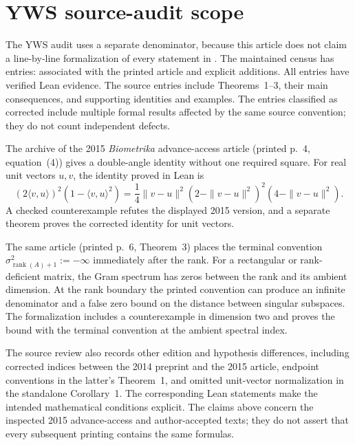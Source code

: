 \section{YWS source-audit scope}
\label{app:yws-coverage}

The YWS audit uses a separate denominator, because this article does not
claim a line-by-line formalization of every statement in
\citet{yu2015davis}. The maintained census has \YWSCensusEntryCount{} entries:
\YWSCensusPaperSourceCount{} associated with the printed article and
\YWSCensusExplicitAdditionCount{} explicit additions. All
\YWSCensusVerifiedCount{} entries have verified Lean evidence. The
source entries include Theorems~1--3, their main consequences, and
supporting identities and examples. The
\YWSCensusCorrectedCount{} entries classified as corrected include multiple
formal results affected by the same source convention; they do not count
independent defects.

The archive of the 2015 \emph{Biometrika} advance-access article (printed
p.~4, equation~(4)) gives a double-angle identity without one required
square. For real unit vectors $u,v$, the identity proved in Lean is
\begin{equation}
  (2\langle v,u\rangle)^2(1-\langle v,u\rangle^2)
  =\frac14\|v-u\|^2(2-\|v-u\|^2)^2(4-\|v-u\|^2).
  \label{eq:yws-equation4-corrected}
\end{equation}
A checked counterexample refutes the displayed 2015 version, and a
separate theorem proves the corrected identity for unit vectors.

The same article (printed p.~6, Theorem~3) places the terminal convention
$\sigma^2_{\operatorname{rank}(A)+1}:=-\infty$ immediately after the rank.
For a rectangular or rank-deficient matrix, the Gram spectrum has zeros
between the rank and its ambient dimension. At the rank boundary the
printed convention can produce an infinite denominator and a false zero
bound on the distance between singular subspaces. The formalization
includes a counterexample in dimension two and proves the bound with the
terminal convention at the ambient spectral index.

The source review also records other edition and hypothesis differences,
including corrected indices between the 2014 preprint and the 2015 article,
endpoint conventions in the latter's Theorem~1, and omitted unit-vector
normalization in the standalone Corollary~1. The corresponding Lean
statements make the intended mathematical conditions explicit. The claims
above concern the inspected 2015 advance-access and author-accepted texts;
they do not assert that every subsequent printing contains the same
formulas.
